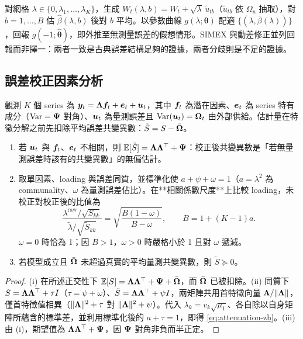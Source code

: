 \documentclass[12pt,a4paper,oneside]{article}
\begin{document}
對網格 $\lambda\in\{0,\lambda_1,\dots,\lambda_K\}$，生成
$W_t(\lambda,b)=W_t+\sqrt{\lambda}\,\tilde{u}_{tb}$（$\tilde{u}_{tb}$ 依 $\Omega_u$ 抽取），對 $b=1,\dots,B$ 估 $\hat\beta(\lambda,b)$ 後對 $b$ 平均。以參數曲線 $g(\lambda;\bm{\theta})$ 配適 $\{(\lambda,\bar{\beta}(\lambda))\}$，回報 $g(-1;\hat{\bm{\theta}})$，即外推至無測量誤差的假想情形。SIMEX 與動差修正並列回報而非擇一：兩者一致是古典誤差結構足夠的證據，兩者分歧則是不足的證據。

\subsection{誤差校正因素分析}\label{app:factor-zh}

觀測 $K$ 個 series 為 $\bm{y}_t=\bm{\Lambda} \bm{f}_t+\bm{e}_t+\bm{u}_t$，其中 $\bm{f}_t$ 為潛在因素、$\bm{e}_t$ 為 series 特有成分（$\operatorname{Var}=\bm{\Psi}$ 對角）、$\bm{u}_t$ 為量測誤差且 $\operatorname{Var}(\bm{u}_t)=\bm{\Omega}_t$ 由外部供給。估計量在特徵分解之前先扣除平均誤差共變異數：$\tilde{S}=S-\bar{\bm{\Omega}}$。

\begin{proposition}[誤差校正共變異數與衰減]\label{prop:factor-zh}
\begin{enumerate}
\item 若 $\bm{u}_t$ 與 $\bm{f}_t$、$\bm{e}_t$ 不相關，則 $\mathbb{E}[\tilde{S}]=\bm{\Lambda}\bm{\Lambda}^\top+\bm{\Psi}$：校正後共變異數是「若無量測誤差時該有的共變異數」的無偏估計。
\item 取單因素、loading 與誤差同質，並標準化使 $a+\psi+\omega=1$（$a=\lambda^2$ 為 communality、$\omega$ 為量測誤差佔比）。在**相關係數尺度**上比較 loading，未校正對校正後的比值為
\begin{equation}
\frac{\lambda^{\mathrm{raw}}/\sqrt{S_{kk}}}{\tilde{\lambda}/\sqrt{\tilde{S}_{kk}}}
=\sqrt{\frac{B(1-\omega)}{B-\omega}},
\qquad B=1+(K-1)a .
\label{eq:attenuation-zh}
\end{equation}
$\omega=0$ 時恰為 1；因 $B>1$，$\omega>0$ 時嚴格小於 1 且對 $\omega$ 遞減。
\item 若模型成立且 $\bar{\bm{\Omega}}$ 未超過真實的平均量測共變異數，則 $\tilde{S}\succeq0$。
\end{enumerate}
\end{proposition}

\begin{proof}
(i) 在所述正交性下 $\mathbb{E}[S]=\bm{\Lambda}\bm{\Lambda}^\top+\bm{\Psi}+\bar{\bm{\Omega}}$，而 $\bar{\bm{\Omega}}$ 已被扣除。(ii) 同質下 $S=\bm{\Lambda}\bm{\Lambda}^\top+\tau I$（$\tau=\psi+\omega$）、$\tilde{S}=\bm{\Lambda}\bm{\Lambda}^\top+\psi I$，兩矩陣共用首特徵向量 $\bm{\Lambda}/\|\bm{\Lambda}\|$，僅首特徵值相異（$\|\bm{\Lambda}\|^2+\tau$ 對 $\|\bm{\Lambda}\|^2+\psi$）。代入 $\lambda_k=v_k\sqrt{\mu_1}$、各自除以自身矩陣所蘊含的標準差，並利用標準化後的 $a+\tau=1$，即得 \eqref{eq:attenuation-zh}。(iii) 由 (i)，期望值為 $\bm{\Lambda}\bm{\Lambda}^\top+\bm{\Psi}$，因 $\bm{\Psi}$ 對角非負而半正定。
\end{proof}
\end{document}
